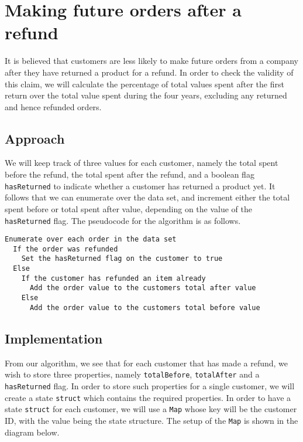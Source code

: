 \newpage
\section{Making future orders after a refund}
It is believed that customers are less likely to make future orders from a company after they have returned a product for a refund. In order to check the validity of this claim, we will calculate the percentage of total values spent after the first return over the total value spent during the four years, excluding any returned and hence refunded orders.

\subsection{Approach}
We will keep track of three values for each customer, namely the total spent before the refund, the total spent after the refund, and a boolean flag \lstinline|hasReturned| to indicate whether a customer has returned a product yet. It follows that we can enumerate over the data set, and increment either the total spent before or total spent after value, depending on the value of the \lstinline|hasReturned| flag. The pseudocode for the algorithm is as follows.

\begin{lstlisting}[language=none]
Enumerate over each order in the data set
  If the order was refunded
    Set the hasReturned flag on the customer to true
  Else
    If the customer has refunded an item already
      Add the order value to the customers total after value
    Else
      Add the order value to the customers total before value
\end{lstlisting}

\subsection{Implementation}
From our algorithm, we see that for each customer that has made a refund, we wish to store three properties, namely \lstinline|totalBefore|, \lstinline|totalAfter| and a \lstinline|hasReturned| flag. In order to store such properties for a single customer, we will create a state \lstinline|struct| which contains the required properties. In order to have a state \lstinline|struct| for each customer, we will use a \lstinline|Map| whose key will be the customer ID, with the value being the state structure. The setup of the \lstinline|Map| is shown in the diagram below.


